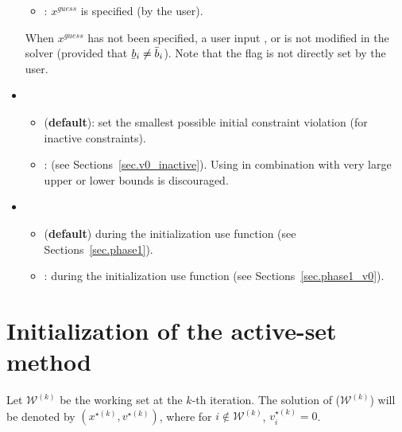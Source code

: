 \documentclass[12pt,a4paper]{article}
\newcommand{\ubar}[1]{\underaccent{\bar}{#1}}
\begin{document}
\begin{itemize}
\begin{itemize}
  \item[\ding{237}] : $x^{\mathit{guess}}$ is specified (by the user).

  \end{itemize}

  \noindent When $x^{\mathit{guess}}$ has not been specified, a user input ,
   or  is not modified in the solver (provided that
  $\ubar{b}_i \neq \bar{b}_i$). Note that the flag  is not directly set
  by the user.

\item {}

  \begin{itemize}
  \item[\ding{237}]  ({\bf default}): set the smallest possible initial constraint violation (for inactive constraints).

  \item[\ding{237}] : (see Sections~\ref{sec.v0_inactive}). Using  in
    combination with very large upper or lower bounds is discouraged.
  \end{itemize}

\item {}

  \begin{itemize}
  \item[\ding{237}]  ({\bf default}) during the initialization use function  (see Sections~\ref{sec.phase1}).

  \item[\ding{237}] : during the initialization use function  (see Sections~\ref{sec.phase1_v0}).
  \end{itemize}

\end{itemize}

\clearpage

\section{Initialization of the active-set method}

Let $\mathcal{W}^{(k)}$ be the working set at the $k$-th iteration. The solution of
($\mathcal{W}^{(k)}$) will be denoted by $(x^{\star(k)},v^{\star(k)})$, where for
$i\not\in \mathcal{W}^{(k)}$, $v_i^{\star(k)} = 0$.
\end{document}
